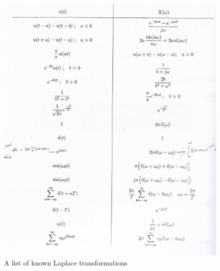\documentclass[10pt,a4paper]{article}
\begin{document}
\begin{figure}[H]
\centering
\includegraphics[scale=1]{FourierContIdentities.PNG}
\caption{A list of known Laplace transformations}
\end{figure}

\newpage
\end{document}
